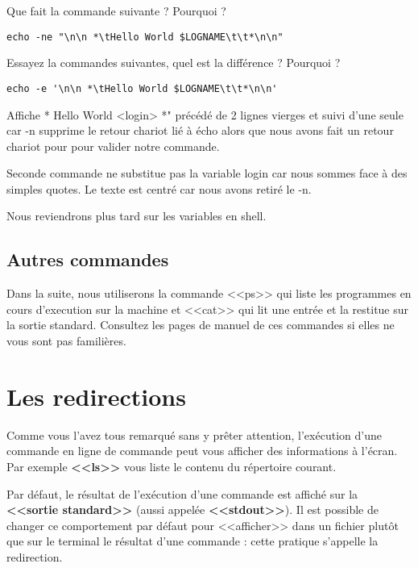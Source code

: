 \documentclass[11pt]{article}
\begin{document}
Que fait la commande suivante ? Pourquoi ?

\begin{lstlisting}[alsoletter={*},emph={*}]
echo -ne "\n\n *\tHello World $LOGNAME\t\t*\n\n"
\end{lstlisting}

Essayez la commandes suivantes, quel est la différence ? Pourquoi ?

\begin{lstlisting}[alsoletter={*},emph={*}]
echo -e '\n\n *\tHello World $LOGNAME\t\t*\n\n'
\end{lstlisting}

\begin{solution}

Affiche  *      Hello World <login>    *" précédé de 2 lignes vierges et suivi d'une seule car -n supprime le retour chariot lié à écho alors que nous avons fait un retour chariot pour pour valider notre commande. 

Seconde commande ne substitue pas la variable login car nous sommes face à des simples quotes. Le texte est centré car nous avons retiré le -n.

Nous reviendrons plus tard sur les variables en shell.
\end{solution}

\subsection{Autres commandes}

Dans la suite, nous utiliserons la commande <<ps>> qui liste les programmes en cours d'execution sur la machine et <<cat>> qui lit une entrée et la restitue sur la sortie standard. Consultez les pages de manuel de ces commandes si elles ne vous sont pas familières.

\section{Les redirections}

Comme vous l’avez tous remarqué sans y prêter attention, l’exécution d’une commande en ligne de commande peut vous 
afficher des informations à l’écran. Par exemple \textbf{<<ls>>} vous liste le contenu du répertoire courant.

Par défaut, le résultat de l'exécution d'une commande est affiché sur la \textbf{<<sortie standard>>} (aussi appelée \textbf{<<stdout>>}). Il est possible 
de changer ce comportement par défaut pour <<afficher>> dans un fichier plutôt que sur le terminal le résultat d'une
commande : cette pratique s’appelle la redirection.
\end{document}
